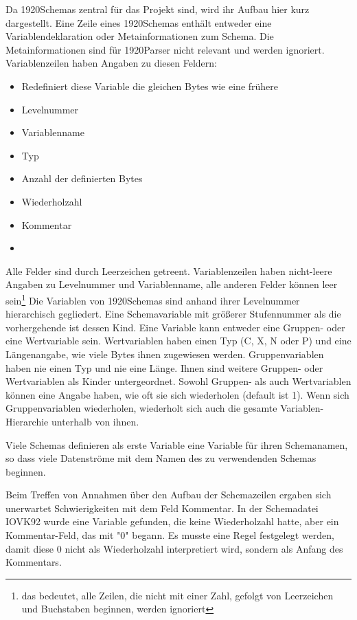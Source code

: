 Da 1920Schemas zentral für das Projekt sind, wird ihr Aufbau hier kurz dargestellt.
Eine Zeile eines 1920Schemas enthält entweder eine Variablendeklaration oder Metainformationen zum Schema. Die Metainformationen sind für 1920Parser nicht relevant und werden ignoriert.
Variablenzeilen haben Angaben zu diesen Feldern:
\begin{itemize}
\item Redefiniert diese Variable die gleichen Bytes wie eine frühere
\item Levelnummer
\item Variablenname
\item Typ
\item Anzahl der definierten Bytes
\item Wiederholzahl
\item Kommentar
\item 
\end{itemize}
Alle Felder sind durch Leerzeichen getreent.
Variablenzeilen haben nicht-leere Angaben zu Levelnummer und Variablenname, alle anderen Felder können leer sein\footnote{das bedeutet, alle Zeilen, die nicht mit einer Zahl, gefolgt von Leerzeichen und Buchstaben beginnen, werden ignoriert}
Die Variablen von 1920Schemas sind anhand ihrer Levelnummer hierarchisch gegliedert. Eine Schemavariable mit größerer Stufennummer als die vorhergehende ist dessen Kind.
Eine Variable kann entweder eine Gruppen- oder eine Wertvariable sein.
Wertvariablen haben einen Typ (C, X, N oder P) und eine Längenangabe, wie viele Bytes ihnen zugewiesen werden.
Gruppenvariablen haben nie einen Typ und nie eine Länge. Ihnen sind weitere Gruppen- oder Wertvariablen als Kinder untergeordnet.
Sowohl Gruppen- als auch Wertvariablen können eine Angabe haben, wie oft sie sich wiederholen (default ist 1). Wenn sich Gruppenvariablen wiederholen, wiederholt sich auch die gesamte Variablen-Hierarchie unterhalb von ihnen.

Viele Schemas definieren als erste Variable eine Variable für ihren Schemanamen, so dass viele Datenströme mit dem Namen des zu verwendenden Schemas beginnen.

Beim Treffen von Annahmen über den Aufbau der Schemazeilen ergaben sich unerwartet Schwierigkeiten mit dem Feld Kommentar. In der Schemadatei IOVK92 wurde eine Variable gefunden, die keine Wiederholzahl hatte, aber ein Kommentar-Feld, das mit "0" begann. Es musste eine Regel festgelegt werden, damit diese 0 nicht als Wiederholzahl interpretiert wird, sondern als Anfang des Kommentars.

